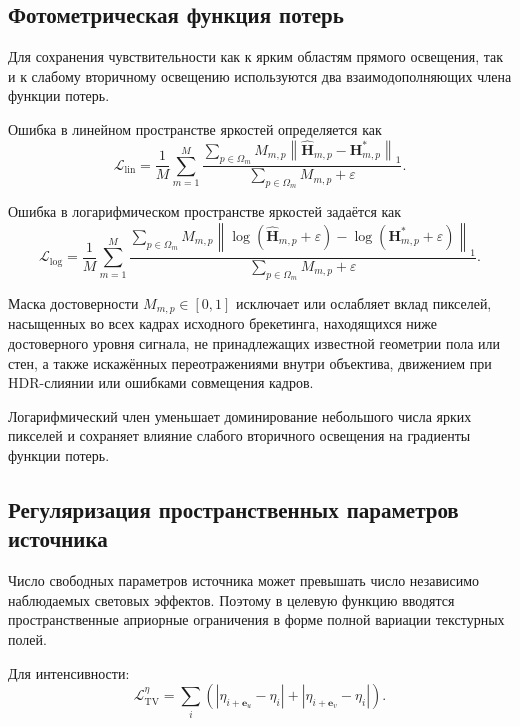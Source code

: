 \subsection{Фотометрическая функция потерь}

Для сохранения чувствительности как к ярким областям прямого освещения, так и к слабому вторичному освещению используются два взаимодополняющих члена функции потерь.

Ошибка в линейном пространстве яркостей определяется как
\begin{equation}
\mathcal{L}_{\mathrm{lin}}
=
\frac{1}{M}
\sum_{m=1}^{M}
\frac{
\sum_{p\in\Omega_m}
M_{m,p}
\left\|
\hat{\mathbf{H}}_{m,p}
-
\mathbf{H}_{m,p}^\ast
\right\|_1
}{
\sum_{p\in\Omega_m}M_{m,p}+\varepsilon
}.
\end{equation}

Ошибка в логарифмическом пространстве яркостей задаётся как
\begin{equation}
\mathcal{L}_{\log}
=
\frac{1}{M}
\sum_{m=1}^{M}
\frac{
\sum_{p\in\Omega_m}
M_{m,p}
\left\|
\log\left(\hat{\mathbf{H}}_{m,p}+\varepsilon\right)
-
\log\left(\mathbf{H}_{m,p}^\ast+\varepsilon\right)
\right\|_1
}{
\sum_{p\in\Omega_m}M_{m,p}+\varepsilon
}.
\end{equation}

Маска достоверности $M_{m,p}\in[0,1]$ исключает или ослабляет вклад пикселей, насыщенных во всех кадрах исходного брекетинга, находящихся ниже достоверного уровня сигнала, не принадлежащих известной геометрии пола или стен, а также искажённых переотражениями внутри объектива, движением при HDR-слиянии или ошибками совмещения кадров.

Логарифмический член уменьшает доминирование небольшого числа ярких пикселей и сохраняет влияние слабого вторичного освещения на градиенты функции потерь.

\subsection{Регуляризация пространственных параметров источника}

Число свободных параметров источника может превышать число независимо наблюдаемых световых эффектов. Поэтому в целевую функцию вводятся пространственные априорные ограничения в форме полной вариации текстурных полей.

Для интенсивности:
\begin{equation}
\mathcal{L}_{\mathrm{TV}}^\eta
=
\sum_i
\left(
|\eta_{i+\mathbf{e}_u}-\eta_i|
+
|\eta_{i+\mathbf{e}_v}-\eta_i|
\right).
\end{equation}

